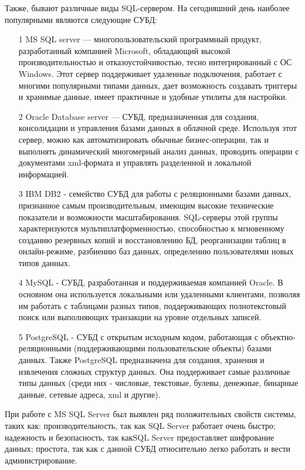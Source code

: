 Также, бывают различные виды SQL-сервером. На сегодняшний день наиболее популярными являются следующие СУБД:
\begin{itemize}
    \item[1] MS SQL server --- многопользовательский программный продукт, разработанный компанией Microsoft, обладающий высокой производительностью и отказоустойчивостью, тесно интегрированный с ОС Windows. Этот сервер поддерживает удаленные подключения, работает с многими популярными типами данных, дает возможность создавать триггеры и хранимые данные, имеет практичные и удобные утилиты для настройки.
    \item[2] Oracle Database server --- СУБД, предназначенная для создания, консолидации и управления базами данных в облачной среде. Используя этот сервер, можно как автоматизировать обычные бизнес-операции, так и выполнять динамический многомерный анализ данных, проводить операции с документами xml-формата и управлять разделенной и локальной информацией.
    \item[3] IBM DB2 - семейство СУБД для работы с реляционными базами данных, признанное самым производительным, имеющим высокие технические показатели и возможности масштабирования. SQL-серверы этой группы характеризуются мультиплатформенностью, способностью к мгновенному созданию резервных копий и восстановлению БД, реорганизации таблиц в онлайн-режиме, разбиению баз данных, определению пользователями новых типов данных.
   \item[4] MySQL - СУБД, разработанная и поддерживаемая компанией Oracle. В основном она используется локальными или удаленными клиентами, позволяя им работать с таблицами разных типов, поддерживающих полнотекстовый поиск или выполняющих транзакции на уровне отдельных записей.
   \item[5] PostgreSQL - СУБД с открытым исходным кодом, работающая с объектно-реляционными (поддерживающими пользовательские объекты) базами данных. Также PostgreSQL предназначена для создания, хранения и извлечения сложных структур данных. Она поддерживает самые различные типы данных (среди них - числовые, текстовые, булевы, денежные, бинарные данные, сетевые адреса, xml и другие).
\end{itemize}


При работе с MS SQL Server был выявлен ряд положительных свойств системы, таких как: производительность, так как SQL Server работает очень быстро; надежность и безопасность, так какSQL Server предоставляет шифрование данных; простота, так как с данной СУБД относительно легко работать и вести администрирование.

